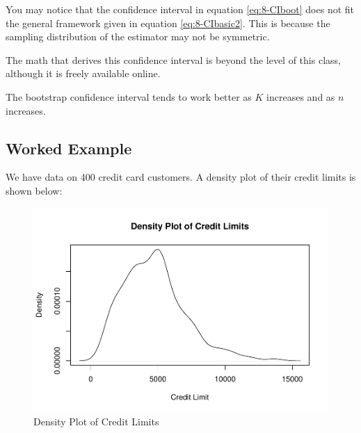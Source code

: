 \documentclass[
]{book}
\newenvironment{Shaded}{\begin{snugshade}}{\end{snugshade}}
\newcommand{\AttributeTok}[1]{\textcolor[rgb]{0.13,0.29,0.53}{#1}}
\newcommand{\FunctionTok}[1]{\textcolor[rgb]{0.13,0.29,0.53}{\textbf{#1}}}
\newcommand{\NormalTok}[1]{#1}
\newcommand{\OtherTok}[1]{\textcolor[rgb]{0.56,0.35,0.01}{#1}}
\newcommand{\SpecialCharTok}[1]{\textcolor[rgb]{0.81,0.36,0.00}{\textbf{#1}}}
\newcommand{\StringTok}[1]{\textcolor[rgb]{0.31,0.60,0.02}{#1}}
\begin{document}
You may notice that the confidence interval in equation \eqref{eq:8-CIboot} does not fit the general framework given in equation \eqref{eq:8-CIbasic2}. This is because the sampling distribution of the estimator may not be symmetric.

The math that derives this confidence interval is beyond the level of this class, although it is freely available online.

The bootstrap confidence interval tends to work better as \(K\) increases and as \(n\) increases.

\hypertarget{worked-example-5}{%
\subsection{Worked Example}\label{worked-example-5}}

We have data on 400 credit card customers. A density plot of their credit limits is shown below:

\begin{Shaded}
\end{Shaded}

\begin{figure}
\centering
\includegraphics{bookdown-demo_files/figure-latex/8-credit-1.pdf}
\caption{\label{fig:8-credit}Density Plot of Credit Limits}
\end{figure}
\end{document}
